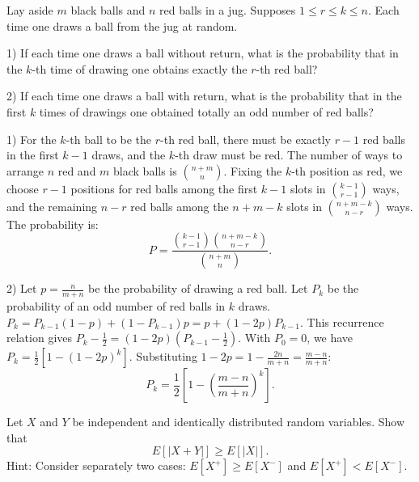 \begin{exercise}
\label{applied:2011:3}
Lay aside $m$ black balls and $n$ red balls in a jug. Supposes $1 \leq r \leq k \leq n$. Each time one draws a ball from the jug at random.

1) If each time one draws a ball without return, what is the probability that in the $k$-th time of drawing one obtains exactly the $r$-th red ball?

2) If each time one draws a ball with return, what is the probability that in the first $k$ times of drawings one obtained totally an odd number of red balls?
\end{exercise}

\begin{solution}
1) For the $k$-th ball to be the $r$-th red ball, there must be exactly $r-1$ red balls in the first $k-1$ draws, and the $k$-th draw must be red.
The number of ways to arrange $n$ red and $m$ black balls is $\binom{n+m}{n}$.
Fixing the $k$-th position as red, we choose $r-1$ positions for red balls among the first $k-1$ slots in $\binom{k-1}{r-1}$ ways, and the remaining $n-r$ red balls among the $n+m-k$ slots in $\binom{n+m-k}{n-r}$ ways.
The probability is:
\[
P = \frac{\binom{k-1}{r-1} \binom{n+m-k}{n-r}}{\binom{n+m}{n}}.
\]

2) Let $p = \frac{n}{m+n}$ be the probability of drawing a red ball. Let $P_k$ be the probability of an odd number of red balls in $k$ draws.
$P_k = P_{k-1}(1-p) + (1-P_{k-1})p = p + (1-2p)P_{k-1}$.
This recurrence relation gives $P_k - \frac{1}{2} = (1-2p)(P_{k-1} - \frac{1}{2})$.
With $P_0 = 0$, we have $P_k = \frac{1}{2} [1 - (1-2p)^k]$.
Substituting $1-2p = 1 - \frac{2n}{m+n} = \frac{m-n}{m+n}$:
\[
P_k = \frac{1}{2} \left[ 1 - \left( \frac{m-n}{m+n} \right)^k \right].
\]
\end{solution}

\begin{exercise}
\label{applied:2011:4}
Let $X$ and $Y$ be independent and identically distributed random variables. Show that
\[
E [ | X + Y | ] \geq E [ | X | ].
\]
Hint: Consider separately two cases: $E [ X ^ { + } ] \geq E [ X ^ { - } ]$ and $E [ X ^ { + } ] < E [ X ^ { - } ]$.
\end{exercise}


